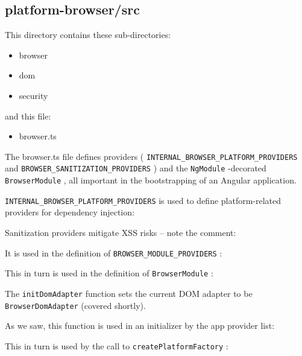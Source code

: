 \subsection{platform-browser/src}

This directory contains these sub-directories:

\begin{itemize}
  \item browser
  \item dom
  \item security
\end{itemize}

and this file:

\begin{itemize}
  \item browser.ts
\end{itemize}

The browser.ts file defines providers (
\texttt{INTERNAL\_BROWSER\_PLATFORM\_PROVIDERS}
and
\texttt{BROWSER\_SANITIZATION\_PROVIDERS}
)  and the
\texttt{NgModule}
-decorated
\texttt{BrowserModule}
, all
important in the bootstrapping of an Angular application.

\texttt{INTERNAL\_BROWSER\_PLATFORM\_PROVIDERS}
is used to define platform-related providers
for dependency injection:



Sanitization providers mitigate XSS risks – note the comment:



It is used in the definition of
\texttt{BROWSER\_MODULE\_PROVIDERS}
:



This in turn is used in the definition of
\texttt{BrowserModule}
:



The
\texttt{initDomAdapter}
function sets the current DOM adapter to be
\texttt{BrowserDomAdapter}
(covered shortly).



As we saw, this function is used in an initializer by the app provider list:



This in turn is used by the call to
\texttt{createPlatformFactory}
:


